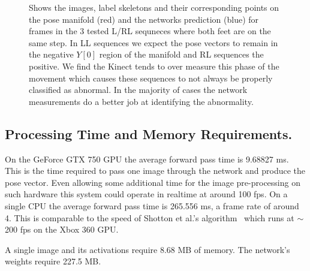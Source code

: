 \documentclass[11pt]{article} %
\begin{document}
\begin{figure}
\qquad%
\caption{Shows the images, label skeletons and their corresponding points on the pose manifold (red) and the networks prediction (blue) for frames in the 3 tested L/RL sequneces where both feet are on the same step. In LL sequences we expect the pose vectors to remain in the negative $Y[0]$ region of the manifold and RL sequences the positive. We find the Kinect tends to over measure this phase of the movement which causes these sequences to not always be properly classified as abnormal. In the majority of cases the network measurements do a better job at identifying the abnormality. }
\label{fig:lrlOverMeasure}
\end{figure}


\subsection{Processing Time and Memory Requirements.}

On the GeForce GTX 750 GPU the average forward pass time is 9.68827 ms. This is the time required to pass one image through the network and produce the pose vector. Even allowing some additional time for the image pre-processing on such hardware this system could operate in realtime at around 100 fps. On a single CPU the average forward pass time is 265.556 ms, a frame rate of around 4. This is comparable to the speed of Shotton et al.'s algorithm~\cite{Shotton2011} which runs at $\sim$200 fps on the Xbox 360 GPU.

 A single image and its activations require 8.68 MB of memory. The network's weights require 227.5 MB. 
\end{document}
